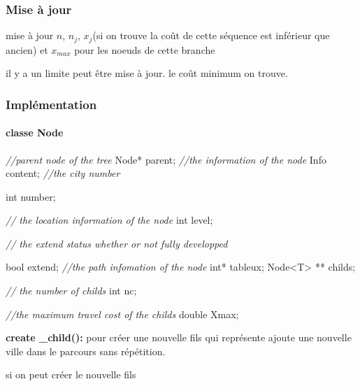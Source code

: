 \documentclass[]{article}
\newenvironment{Shaded}{}{}
\newcommand{\CommentTok}[1]{\textcolor[rgb]{0.38,0.63,0.69}{\textit{#1}}}
\newcommand{\DataTypeTok}[1]{\textcolor[rgb]{0.56,0.13,0.00}{#1}}
\newcommand{\NormalTok}[1]{#1}
\let\oldparagraph\paragraph
\renewcommand{\paragraph}[1]{\oldparagraph{#1}\mbox{}}
\begin{document}
\hypertarget{mise-uxe0-jour}{%
\subsubsection{Mise à jour}\label{mise-uxe0-jour}}

mise à jour \(n\), \(n_j\), \(x_j\)(si on trouve la coût de cette
séquence est inférieur que ancien) et \(x_{max}\) pour les noeuds de
cette branche

il y a un limite peut être mise à jour. le coût minimum on trouve.

\hypertarget{impluxe9mentation-1}{%
\subsubsection{Implémentation}\label{impluxe9mentation-1}}

\hypertarget{classe-node}{%
\paragraph{classe Node}\label{classe-node}}

\begin{Shaded}
\begin{Highlighting}[]
\CommentTok{//parent node of the tree}
\NormalTok{	Node* parent;}
    \CommentTok{//the information of the node }
\NormalTok{    Info content;}
\CommentTok{//the city number}

\DataTypeTok{int}\NormalTok{ number;}

\CommentTok{// the location information of the node }
\DataTypeTok{int}\NormalTok{ level;}

\CommentTok{// the extend status whether or not fully developped}

\DataTypeTok{bool}\NormalTok{ extend;}
\CommentTok{//the  path infomation of the node}
\DataTypeTok{int}\NormalTok{*  tableux;}
\NormalTok{Node<T> ** childs;}

\CommentTok{// the number of childs}
\DataTypeTok{int}\NormalTok{ nc;}

\CommentTok{//the maximum travel cost of the childs}
\DataTypeTok{double}\NormalTok{ Xmax;}
\end{Highlighting}
\end{Shaded}

\textbf{create \_child():} pour créer une nouvelle fils qui représente
ajoute une nouvelle ville dans le parcours sans répétition.

si on peut créer le nouvelle fils
\end{document}
